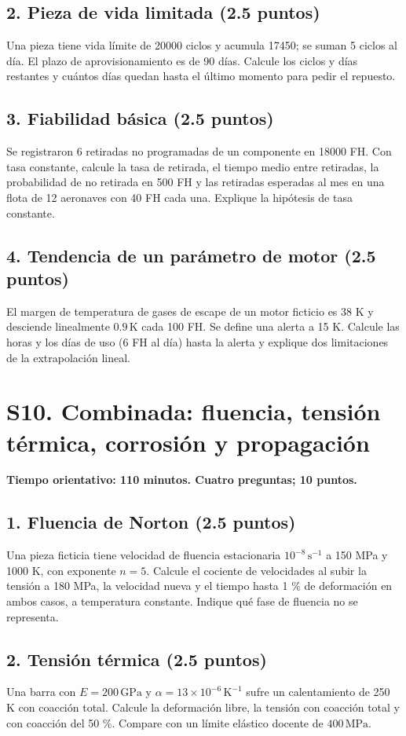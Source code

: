 \section*{2. Pieza de vida limitada (2.5 puntos)}
Una pieza tiene vida límite de 20000 ciclos y acumula 17450; se suman 5 ciclos al día. El plazo de aprovisionamiento es de 90 días. Calcule los ciclos y días restantes y cuántos días quedan hasta el último momento para pedir el repuesto.

\section*{3. Fiabilidad básica (2.5 puntos)}
Se registraron 6 retiradas no programadas de un componente en 18000 FH. Con tasa constante, calcule la tasa de retirada, el tiempo medio entre retiradas, la probabilidad de no retirada en 500 FH y las retiradas esperadas al mes en una flota de 12 aeronaves con 40 FH cada una. Explique la hipótesis de tasa constante.

\section*{4. Tendencia de un parámetro de motor (2.5 puntos)}
El margen de temperatura de gases de escape de un motor ficticio es 38 K y desciende linealmente $0.9\,\mathrm K$ cada 100 FH. Se define una alerta a 15 K. Calcule las horas y los días de uso (6 FH al día) hasta la alerta y explique dos limitaciones de la extrapolación lineal.

\chapter{S10. Combinada: fluencia, tensión térmica, corrosión y propagación}
\noindent\textbf{Tiempo orientativo: 110 minutos. Cuatro preguntas; 10 puntos.}
\section*{1. Fluencia de Norton (2.5 puntos)}
Una pieza ficticia tiene velocidad de fluencia estacionaria $10^{-8}\,\mathrm{s^{-1}}$ a 150 MPa y 1000 K, con exponente $n=5$. Calcule el cociente de velocidades al subir la tensión a 180 MPa, la velocidad nueva y el tiempo hasta 1 \% de deformación en ambos casos, a temperatura constante. Indique qué fase de fluencia no se representa.

\section*{2. Tensión térmica (2.5 puntos)}
Una barra con $E=200\,\mathrm{GPa}$ y $\alpha=13\times10^{-6}\,\mathrm{K^{-1}}$ sufre un calentamiento de 250 K con coacción total. Calcule la deformación libre, la tensión con coacción total y con coacción del 50 \%. Compare con un límite elástico docente de $400\,\mathrm{MPa}$.

